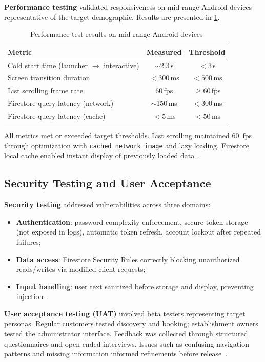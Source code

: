\textbf{Performance testing} validated responsiveness on mid-range Android devices representative of the target demographic.
Results are presented in \cref{tab:performance}.

\begin{table}[htbp]
\caption{Performance test results on mid-range Android devices}
\label{tab:performance}
\centering
\small
\begin{tabular}{lcc}
\toprule
\textbf{Metric} & \textbf{Measured} & \textbf{Threshold} \\
\midrule
Cold start time (launcher $\to$ interactive) & $\sim$2.3\,s & $< 3$\,s \\
Screen transition duration & $< 300$\,ms & $< 500$\,ms \\
List scrolling frame rate & 60\,fps & $\geq 60$\,fps \\
Firestore query latency (network) & $\sim$150\,ms & $< 300$\,ms \\
Firestore query latency (cache) & $< 5$\,ms & $< 50$\,ms \\
\bottomrule
\end{tabular}
\end{table}

All metrics met or exceeded target thresholds.
List scrolling maintained 60~fps through optimization with \texttt{cached\_network\_image} and lazy loading.
Firestore local cache enabled instant display of previously loaded data~\cite{flutter_arch2024}.

\subsection{Security Testing and User Acceptance}
\label{subsec:security-uat}

\textbf{Security testing} addressed vulnerabilities across three domains:
\begin{itemize}
  \item \textbf{Authentication}: password complexity enforcement, secure token storage (not exposed in logs), automatic token refresh, account lockout after repeated failures;
  \item \textbf{Data access}: Firestore Security Rules correctly blocking unauthorized reads/writes via modified client requests;
  \item \textbf{Input handling}: user text sanitized before storage and display, preventing injection~\cite{firebase_auth2024}.
\end{itemize}

\textbf{User acceptance testing (UAT)} involved beta testers representing target personas.
Regular customers tested discovery and booking; establishment owners tested the administrator interface.
Feedback was collected through structured questionnaires and open-ended interviews.
Issues such as confusing navigation patterns and missing information informed refinements before release~\cite{nielsen2012}.

